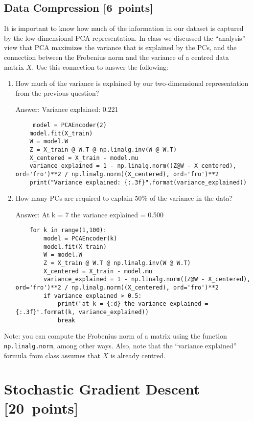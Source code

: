 \documentclass{article}
\newcommand{\blu}[1]{{\textcolor{blu}{#1}}}
\newcommand{\gre}[1]{\textcolor{gre}{#1}}
\newcommand\ans[1]{\par\gre{Answer: #1}}
\let\ask\blu
\newcommand\pts[1]{\textcolor{pointscolour}{[#1~points]}}
\begin{document}
\subsection{Data Compression \pts{6}}
It is important to know how much of the information in our dataset is captured by the low-dimensional PCA representation.
In class we discussed the ``analysis'' view that PCA maximizes the variance that is explained by the PCs, and the connection between the Frobenius norm and the variance of a centred data matrix $X$.
Use this connection to answer the following:
\begin{enumerate}
	\item \ask{How much of the variance is explained by our two-dimensional representation from the previous question?}
    \ans{Variance explained: 0.221}
    \begin{verbatim}
     model = PCAEncoder(2)
    model.fit(X_train)
    W = model.W
    Z = X_train @ W.T @ np.linalg.inv(W @ W.T)
    X_centered = X_train - model.mu
    variance_explained = 1 - np.linalg.norm((Z@W - X_centered), ord='fro')**2 / np.linalg.norm((X_centered), ord='fro')**2
    print("Variance explained: {:.3f}".format(variance_explained))
    \end{verbatim}
	\item \ask{How many PCs are required to explain 50\% of the variance in the data?}
        \ans{At k = 7 the variance explained = 0.500}
        \begin{verbatim}
    for k in range(1,100):
        model = PCAEncoder(k)
        model.fit(X_train)
        W = model.W
        Z = X_train @ W.T @ np.linalg.inv(W @ W.T)
        X_centered = X_train - model.mu
        variance_explained = 1 - np.linalg.norm((Z@W - X_centered), ord='fro')**2 / np.linalg.norm((X_centered), ord='fro')**2
        if variance_explained > 0.5:
            print("at k = {:d} the variance explained = {:.3f}".format(k, variance_explained))
            break
        \end{verbatim}
\end{enumerate}
Note: you can compute the Frobenius norm of a matrix using the function \texttt{np.linalg.norm}, among other ways. Also, note that the ``variance explained'' formula from class assumes that $X$ is already centred.


\clearpage
\section{Stochastic Gradient Descent \pts{20}}
\end{document}
